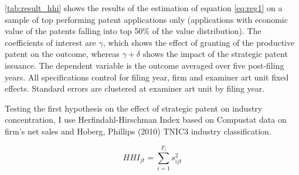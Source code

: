 \documentclass[11pt]{article}
\begin{document}
\autoref{tab:result_hhi} shows the results of the estimation of equation \eqref{eq:reg1} on a sample of top performing patent applications only (applications with economic value of the patents falling into top 50\% of the value distribution). The coefficients of interest are $\gamma$, which shows the effect of granting of the productive patent on the outcome, whereas $\gamma+\delta$ shows the impact of the strategic patent issuance. The dependent variable is the outcome averaged over five post-filing years. All specifications control for filing year, firm and examiner art unit fixed effects. Standard errors are clustered at examiner art unit by filing year.

Testing the first hypothesis on the effect of strategic patent on industry concentration, I use Herfindahl-Hirschman Index based on Compustat data on firm’s net sales and \color{blue} Hoberg, Phillips (2010) \color{black} TNIC3 industry classification. 

\begin{equation}
\label{eq:hhi}
	HHI_{jt}=\sum_{i=1}^{F_i} s^2_{ijt}
\end{equation}
\end{document}
